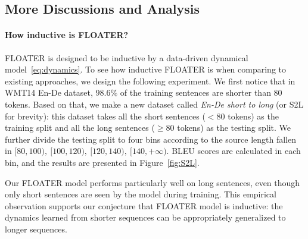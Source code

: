 \documentclass[11pt]{article}
\begin{document}
\subsection{More Discussions and Analysis}
\label{sec:exp-analysis}
\paragraph{How inductive is FLOATER?}
FLOATER is designed to be inductive by a data-driven dynamical model~\eqref{eq:dynamics}. To see how inductive FLOATER is when comparing to existing approaches, we design the following experiment. We first notice that in WMT14 En-De dataset, $98.6\%$ of the training sentences are shorter than $80$ tokens. Based on that, we make a new dataset called \emph{En-De short to long} (or S2L for brevity): this dataset takes all the short sentences ($<80$ tokens) as the training split and all the long sentences ($\ge 80$ tokens) as the testing split. We further divide the testing split to four bins according to the source length fallen in $[80, 100),\ [100, 120),\ [120, 140),\ [140, +\infty)$. BLEU scores are calculated in each bin, and the results are presented in Figure~\ref{fig:S2L}. 

Our FLOATER model performs particularly well on long sentences, even though only short sentences are seen by the model during training. This empirical observation supports our conjecture that FLOATER model is inductive: the dynamics learned from shorter sequences can be appropriately generalized to longer sequences.
\end{document}
